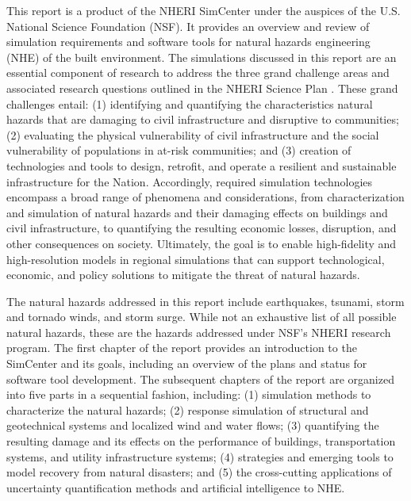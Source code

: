 %
%

\preface

This report is a product of the NHERI SimCenter under the auspices of the U.S. National Science Foundation (NSF). It provides an overview and review of simulation requirements and software tools for natural hazards engineering (NHE) of the built environment. The simulations discussed in this report are an essential component of research to address the three grand challenge areas and associated research questions outlined in the NHERI Science Plan \citep{edge2020natural}. These grand challenges entail: (1) identifying and quantifying the characteristics natural hazards that are damaging to civil infrastructure and disruptive to communities; (2) evaluating the physical vulnerability of civil infrastructure and the social vulnerability of populations in at-risk communities; and (3) creation of technologies and tools to design, retrofit, and operate a resilient and sustainable infrastructure for the Nation. Accordingly, required simulation technologies encompass a broad range of phenomena and considerations, from characterization and simulation of natural hazards and their damaging effects on buildings and civil infrastructure, to quantifying the resulting economic losses, disruption, and other consequences on society. Ultimately, the goal is to enable high-fidelity and high-resolution models in regional simulations that can support technological, economic, and policy solutions to mitigate the threat of natural hazards.

The natural hazards addressed in this report include earthquakes, tsunami, storm and tornado winds, and storm surge. While not an exhaustive list of all possible natural hazards, these are the hazards addressed under NSF's NHERI research program. The first chapter of the report provides an introduction to the SimCenter and its goals, including an overview of the plans and status for software tool development.  The subsequent chapters of the report are organized into five parts in a sequential fashion, including: (1) simulation methods to characterize the natural hazards; (2) response simulation of structural and geotechnical systems and localized wind and water flows; (3) quantifying the resulting damage and its effects on the performance of buildings, transportation systems, and utility infrastructure systems; (4) strategies and emerging tools to model recovery from natural disasters; and (5) the cross-cutting applications of uncertainty quantification methods and artificial intelligence to NHE. 

